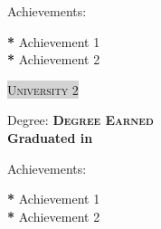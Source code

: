 \documentclass[a4paper, oneside, final]{scrartcl}
\begin{document}
\begin{center}
\begin{multicols}{2}
        \begin{flushleft}
            \small{Achievements}: 
        \end{flushleft}
        \begin{flushleft}
            \small{\bf{*}} Achievement 1 \\
            \small{\bf{*}} Achievement 2
        \end{flushleft}

        \parbox{\columnwidth} {
            \colorbox{LightGrey} {
                \textsc{\small{University 2}}
            }
        }

        \begin{flushleft}
            \small{Degree}: \bf{\textsc{Degree Earned}} \\
            \small{\bf{Graduated in}} \textsc{\bf{}} \\ 
        \end{flushleft}

        \begin{flushleft}
            \small{Achievements}: 
        \end{flushleft}
        \begin{flushleft}
            \small{\bf{*}} Achievement 1 \\
            \small{\bf{*}} Achievement 2
        \end{flushleft}

    \end{multicols}

\end{center}
\end{document}
